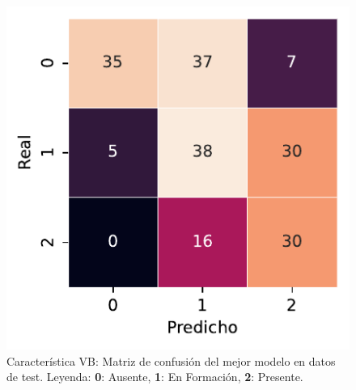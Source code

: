 \begin{figure}[htbp]
    \vspace{1.5em} %

    \includegraphics[width=0.6\linewidth]{figures/5_experiments/single-vb-cm.pdf}
    \caption[Característica VB: Matriz de confusión del mejor modelo en datos de test.]{Característica VB: Matriz de confusión del mejor modelo en datos de test. Leyenda: \textbf{0}: Ausente, \textbf{1}: En Formación, \textbf{2}: Presente.}
    \label{fig5:VB_confusion_matrix}
\end{figure}

